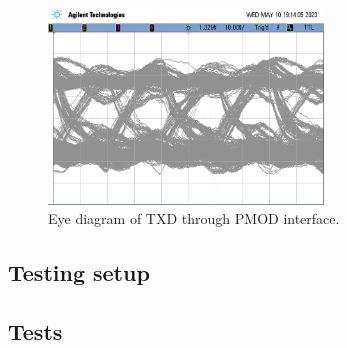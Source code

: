 \begin{figure}[h]
    \centering
    \includegraphics[width=0.65\textwidth]{Images/EyeDiagramTX.png}
    \caption[Eye diagram of TXD through PMOD interface]{Eye diagram of TXD through PMOD interface.}
    \label{fig:eye_diagram}
\end{figure}


\subsection{Testing setup}

\subsection{Tests}


